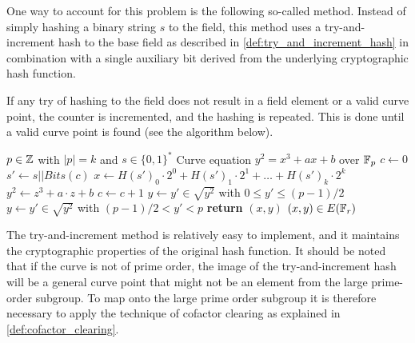 One way to account for this problem is the following so-called  method. Instead of simply hashing a binary string $s$ to the field, this method uses a try-and-increment hash to the base field as described in \ref{def:try_and_increment_hash} in combination with a single auxiliary bit derived from the underlying cryptographic hash function.

If any try of hashing to the field does not result in a field element or a valid curve point, the counter is incremented, and the hashing is repeated. This is done until a valid curve point is found (see the algorithm below).

\begin{algorithm}\label{alg:hash-to-e}\caption{Hash-to-$E(\F_p)$}
\begin{algorithmic}[0]
\Require $p \in \mathbb{Z}$ with $|p|=k$ and $s\in\{0,1\}^*$
\Require Curve equation $y^2 = x^3 + ax +b$ over $\mathbb{F}_p$
\State $c \gets 0$	
\Repeat
\State $s' \gets s||Bits(c)$
\State $x \gets H(s')_0\cdot 2^0 + H(s')_1\cdot 2^1 + \ldots + H(s')_{k}\cdot 2^{k}$ 
\State $y^2 \gets z^3 + a\cdot z + b$ 
\State $c\gets c+1$
 
 
\State $y \gets y'\in \sqrt{y^2}$ with $0\leq y' \leq (p-1)/2$
\Else 
\State $y \gets y'\in \sqrt{y^2}$ with $(p-1)/2 < y' < p$
\EndIf
\State \textbf{return} $(x,y)$
\EndProcedure
\Ensure $(x,y)\in E(\mathbb{F}_r)$
\end{algorithmic}
\end{algorithm}

The try-and-increment method is relatively easy to implement, and it maintains the cryptographic properties of the original hash function. It should be noted that if the curve is not of prime order, the image of the try-and-increment hash will be a general curve point that might not be an element from the large prime-order subgroup. To map onto the large prime order subgroup it is therefore necessary to apply the technique of cofactor clearing as explained in \ref{def:cofactor_clearing}.

